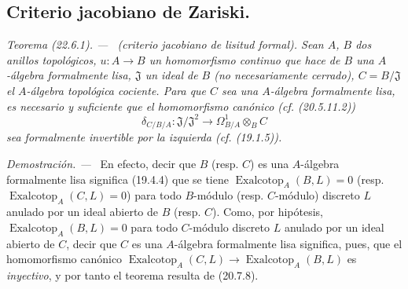 \documentclass[10pt,oneside]{book}
\makeatletter
\newcommand{\setmanualcurrentlabel}[1]{\def\@currentlabel{#1}}
\newenvironment{theorem}[1][]{%
  \setmanualcurrentlabel{#1}\par\medskip\noindent\itshape Teorema (#1). ---\ }{\par}
\newenvironment{proof}{%
  \par\medskip\noindent\textit{Demostración. ---\ }}{\par}
\makeatother
\begin{document}
\subsection{Criterio jacobiano de Zariski.}
\label{subsection:0.22.6-es}

\begin{theorem}[22.6.1]
\label{0.22.6.1-es}
\textnormal{(criterio jacobiano de lisitud formal).}
Sean $A$, $B$ dos anillos topológicos,
$u:A\longrightarrow B$ un homomorfismo continuo que hace de $B$ una
$A$-álgebra \textup{formalmente lisa}, $\mathfrak J$ un ideal de $B$ (no
necesariamente cerrado), $C=B/\mathfrak J$ el $A$-álgebra topológica cociente.
Para que $C$ sea una $A$-álgebra formalmente lisa, es necesario y suficiente que
el homomorfismo canónico \textup{(cf. (20.5.11.2))}
\begin{equation}
\label{0.22.6.1.1-es}
  \delta_{C/B/A}:\mathfrak J/\mathfrak J^2
  \longrightarrow\Omega^1_{B/A}\otimes_BC
  \tag{22.6.1.1}
\end{equation}
sea formalmente invertible por la izquierda \textup{(cf. (19.1.5))}.
\end{theorem}

\begin{proof}
En efecto, decir que $B$ (resp. $C$) es una $A$-álgebra formalmente lisa
significa (19.4.4) que se tiene
$\operatorname{Exalcotop}_A(B,L)=0$ (resp.
$\operatorname{Exalcotop}_A(C,L)=0$) para todo $B$-módulo (resp. $C$-módulo)
discreto $L$ anulado por un ideal abierto de $B$ (resp. $C$). Como, por hipótesis,
$\operatorname{Exalcotop}_A(B,L)=0$ para todo $C$-módulo discreto $L$ anulado
por un ideal abierto de $C$, decir que $C$ es una $A$-álgebra formalmente lisa
significa, pues, que el homomorfismo canónico
$\operatorname{Exalcotop}_A(C,L)\longrightarrow
\operatorname{Exalcotop}_A(B,L)$ es \emph{inyectivo}, y por tanto el teorema resulta de
(20.7.8).
\end{proof}
\end{document}

